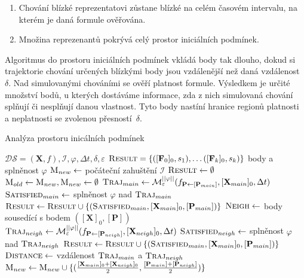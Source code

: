 \begin{enumerate}
	\item	Chování blízké reprezentatovi zůstane blízké na celém časovém intervalu,
			na kterém je daná formule ověřována.
	\item	Množina reprezenantů pokrývá celý prostor iniciálních podmínek.
\end{enumerate}

Algoritmus do prostoru iniciálních podmínek vkládá body tak dlouho, dokud si trajektorie chování
určených blízkými body jsou vzdálenější než daná vzdálenost $\delta$. Nad simulovanými chováními
se ověří platnost formule. Výsledkem je určité množství bodů, u kterých dostáváme informace,
zda z nich simulovaná chování splňují či nesplňují danou vlastnost. Tyto body nastíní
hranice regionů platnosti a neplatnosti se zvolenou přes\-nos\-tí~$\delta$.

\begin{algorithm}
\caption{Analýza prostoru inicálních podmínek}
\label{algorithm:main:original}
\begin{algorithmic}[1]
\Require 	$\mathcal{DS} = (\mathbf{X}, f), \mathcal{I}, \varphi, \Delta t, \delta, \varepsilon$
\Ensure 	$\textsc{Result} = \{([\mathbf{F}_0]_0, s_1), \ldots ([\mathbf{F}_k]_0, s_k)\}$ \Comment body a splněnost $\varphi$
\State		$\textsc{M}_{new} 	\gets $ počáteční zahuštění $\mathcal{I}$
\State		$\textsc{Result} \gets \emptyset$
	\State $\textsc{M}_{old} \gets \textsc{M}_{new}, \textsc{M}_{new} \gets \emptyset$
		\State $\textsc{Traj}_{main} \gets \mathcal{M}^{||\varphi||}_\varepsilon(f_{\mathbf{P} \gets [\mathbf{P}_{main}]}, [\mathbf{X}_{main}]_0, \Delta t)$
		\State $\textsc{Satisfied}_{main} \gets $ splněnost $\varphi$ nad $\textsc{Traj}_{main}$
		\State $\textsc{Result} \gets \textsc{Result} \cup \{(\textsc{Satisfied}_{main}, [\mathbf{X}_{main}]_0, [\mathbf{P}_{main}])\}$
		\State $\textsc{Neigh} \gets $ body sousedící s bodem $([\mathbf{X}]_0, [\mathbf{P}])$
			\State $\textsc{Traj}_{neigh} \gets \mathcal{M}^{||\varphi||}_\varepsilon(f_{\mathbf{P} \gets [\mathbf{P}_{neigh}]}, [\mathbf{X}_{neigh}]_0, \Delta t)$
			\State $\textsc{Satisfied}_{neigh} \gets $ splněnost $\varphi$ nad $\textsc{Traj}_{neigh}$
			\State $\textsc{Result} \gets \textsc{Result} \cup \{(\textsc{Satisfied}_{main}, [\mathbf{X}_{main}]_0, [\mathbf{P}_{main}])\}$
			\State $\textsc{Distance} \gets $ vzdálenost $\textsc{Traj}_{main}$ a $\textsc{Traj}_{neigh}$\label{algorithm:line:trajectory:distance}
			\label{algorithm:line:trajectory:delta}
				\State	$\textsc{M}_{new} \gets \textsc{M}_{new} \cup \{(\frac{[\mathbf{X}_{main}]_0 + [\mathbf{X}_{neigh}]_0}{2}, \frac{[\mathbf{P}_{main}] + [\mathbf{P}_{neigh}]}{2})\}$
			\EndIf
		\EndFor
	\EndFor
\EndWhile
\end{algorithmic}
\end{algorithm}

